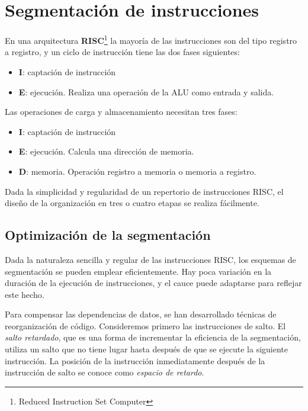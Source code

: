 \section{Segmentación de instrucciones}

En una arquitectura \textbf{RISC}\footnote{Reduced Instruction Set Computer} la mayoría de las instrucciones son del tipo registro a registro, y un ciclo de instrucción tiene las dos fases siguientes:

\begin{itemize}
  \item \textbf{I}: captación de instrucción
  \item \textbf{E}: ejecución. Realiza una operación de la ALU como entrada y salida.
\end{itemize}

Las operaciones de carga y almacenamiento necesitan tres fases:

\begin{itemize}
  \item \textbf{I}: captación de instrucción
  \item \textbf{E}: ejecución. Calcula una dirección de memoria.
  \item \textbf{D}: memoria. Operación registro a memoria o memoria a registro.
\end{itemize}

Dada la simplicidad y regularidad de un repertorio de instrucciones RISC, el diseño de la organización en tres o cuatro etapas se realiza fácilmente. 

\subsection{Optimización de la segmentación}

Dada la naturaleza sencilla y regular de las instrucciones RISC, los esquemas de segmentación se pueden emplear eficientemente. Hay poca variación en la duración de la ejecución de instrucciones, y el cauce puede adaptarse para reflejar este hecho.

Para compensar las dependencias de datos, se han desarrollado técnicas de reorganización de código. Consideremos primero las instrucciones de salto. El \textit{salto retardado}, que es una forma de incrementar la eficiencia de la segmentación, utiliza un salto que no tiene lugar hasta después de que se ejecute la siguiente instrucción. La posición de la instrucción inmediatamente después de la instrucción de salto se conoce como \textit{espacio de retardo}.


